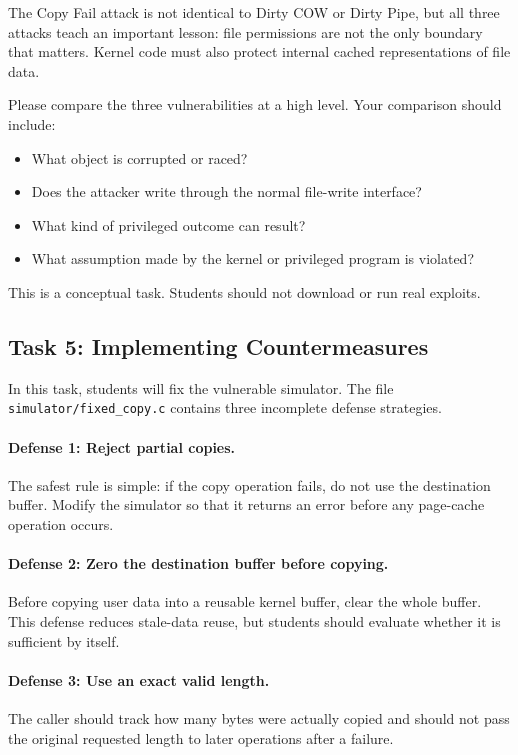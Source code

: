 The Copy Fail attack is not identical to Dirty COW or Dirty Pipe, but all three
attacks teach an important lesson: file permissions are not the only boundary
that matters. Kernel code must also protect internal cached representations of
file data.

Please compare the three vulnerabilities at a high level. Your comparison
should include:

\begin{itemize}[noitemsep]
\item What object is corrupted or raced?
\item Does the attacker write through the normal file-write interface?
\item What kind of privileged outcome can result?
\item What assumption made by the kernel or privileged program is violated?
\end{itemize}

This is a conceptual task. Students should not download or run real exploits.


\subsection{Task 5: Implementing Countermeasures}

In this task, students will fix the vulnerable simulator. The file
\texttt{simulator/fixed\_copy.c} contains three incomplete defense strategies.

\paragraph{Defense 1: Reject partial copies.}
The safest rule is simple: if the copy operation fails, do not use the
destination buffer. Modify the simulator so that it returns an error before any
page-cache operation occurs.

\paragraph{Defense 2: Zero the destination buffer before copying.}
Before copying user data into a reusable kernel buffer, clear the whole buffer.
This defense reduces stale-data reuse, but students should evaluate whether it
is sufficient by itself.

\paragraph{Defense 3: Use an exact valid length.}
The caller should track how many bytes were actually copied and should not pass
the original requested length to later operations after a failure.


